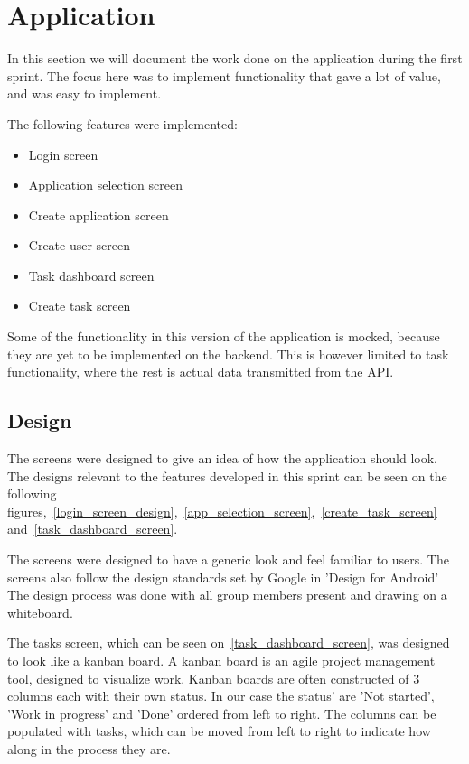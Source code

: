 \section{Application}
In this section we will document the work done on the application during the first sprint.
The focus here was to implement functionality that gave a lot of value, and was easy to implement.

The following features were implemented:
\begin{itemize}
    \item Login screen
    \item Application selection screen
    \item Create application screen
    \item Create user screen
    \item Task dashboard screen
    \item Create task screen
\end{itemize}

Some of the functionality in this version of the application is mocked, because they are yet to be implemented on the backend.
This is however limited to task functionality, where the rest is actual data transmitted from the API.

\subsection{Design}
\label{sprint_1_design}
The screens were designed to give an idea of how the application should look.
The designs relevant to the features developed in this sprint can be seen on the following figures,~\autoref{login_screen_design},~\autoref{app_selection_screen},~\autoref{create_task_screen} and~\autoref{task_dashboard_screen}.

The screens were designed to have a generic look and feel familiar to users.
The screens also follow the design standards set by Google in 'Design for Android' \cite{AndroidDesign}
The design process was done with all group members present and drawing on a whiteboard.



The tasks screen, which can be seen on~\autoref{task_dashboard_screen}, was designed to look like a kanban board.
A kanban board is an agile project management tool, designed to visualize work.
Kanban boards are often constructed of 3 columns each with their own status. In our case the status' are 'Not started', 'Work in progress' and 'Done' ordered from left to right.
The columns can be populated with tasks, which can be moved from left to right to indicate how along in the process they are.

